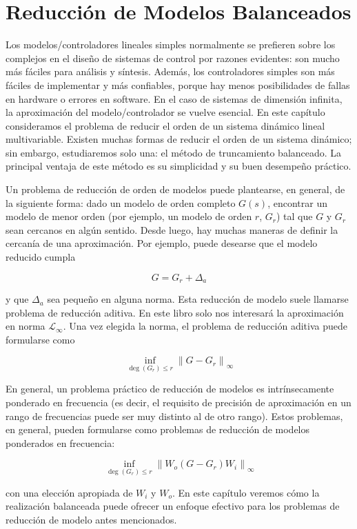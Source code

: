 \chapter{Reducción de Modelos Balanceados}
Los modelos/controladores lineales simples normalmente se prefieren sobre los complejos en el diseño de sistemas de control por razones evidentes: son mucho más fáciles para análisis y síntesis. Además, los controladores simples son más fáciles de implementar y más confiables, porque hay menos posibilidades de fallas en hardware o errores en software. En el caso de sistemas de dimensión infinita, la aproximación del modelo/controlador se vuelve esencial. En este capítulo consideramos el problema de reducir el orden de un sistema dinámico lineal multivariable. Existen muchas formas de reducir el orden de un sistema dinámico; sin embargo, estudiaremos solo una: el método de truncamiento balanceado. La principal ventaja de este método es su simplicidad y su buen desempeño práctico.

Un problema de reducción de orden de modelos puede plantearse, en general, de la siguiente forma: dado un modelo de orden completo $G(s)$, encontrar un modelo de menor orden (por ejemplo, un modelo de orden $r$, $G_{r}$) tal que $G$ y $G_{r}$ sean cercanos en algún sentido. Desde luego, hay muchas maneras de definir la cercanía de una aproximación. Por ejemplo, puede desearse que el modelo reducido cumpla

$$
G=G_{r}+\Delta_{a}
$$

y que $\Delta_{a}$ sea pequeño en alguna norma. Esta reducción de modelo suele llamarse problema de reducción aditiva. En este libro solo nos interesará la aproximación en norma $\mathcal{L}_{\infty}$. Una vez elegida la norma, el problema de reducción aditiva puede formularse como

$$
\inf _{\operatorname{deg}\left(G_{r}\right) \leq r}\left\|G-G_{r}\right\|_{\infty}
$$

En general, un problema práctico de reducción de modelos es intrínsecamente ponderado en frecuencia (es decir, el requisito de precisión de aproximación en un rango de frecuencias puede ser muy distinto al de otro rango). Estos problemas, en general, pueden formularse como problemas de reducción de modelos ponderados en frecuencia:

$$
\inf _{\operatorname{deg}\left(G_{r}\right) \leq r}\left\|W_{o}\left(G-G_{r}\right) W_{i}\right\|_{\infty}
$$

con una elección apropiada de $W_{i}$ y $W_{o}$. En este capítulo veremos cómo la realización balanceada puede ofrecer un enfoque efectivo para los problemas de reducción de modelo antes mencionados.

